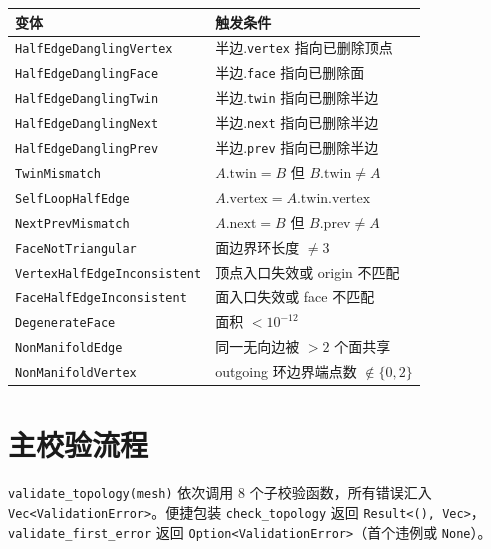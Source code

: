 \documentclass[11pt,a4paper]{article}
\begin{document}
\begin{center}
\renewcommand{\arraystretch}{1.18}
\begin{tabular}{@{}ll@{}}
  \toprule
  \textbf{变体} & \textbf{触发条件} \\
  \midrule
  \texttt{HalfEdgeDanglingVertex} & 半边.\texttt{vertex} 指向已删除顶点 \\
  \texttt{HalfEdgeDanglingFace}   & 半边.\texttt{face} 指向已删除面 \\
  \texttt{HalfEdgeDanglingTwin}   & 半边.\texttt{twin} 指向已删除半边 \\
  \texttt{HalfEdgeDanglingNext}   & 半边.\texttt{next} 指向已删除半边 \\
  \texttt{HalfEdgeDanglingPrev}   & 半边.\texttt{prev} 指向已删除半边 \\
  \texttt{TwinMismatch}           & $A.\mathrm{twin}=B$ 但 $B.\mathrm{twin}\ne A$ \\
  \texttt{SelfLoopHalfEdge}       & $A.\mathrm{vertex} = A.\mathrm{twin}.\mathrm{vertex}$ \\
  \texttt{NextPrevMismatch}       & $A.\mathrm{next}=B$ 但 $B.\mathrm{prev}\ne A$ \\
  \texttt{FaceNotTriangular}      & 面边界环长度 $\ne 3$ \\
  \texttt{VertexHalfEdgeInconsistent} & 顶点入口失效或 origin 不匹配 \\
  \texttt{FaceHalfEdgeInconsistent}   & 面入口失效或 face 不匹配 \\
  \texttt{DegenerateFace}         & 面积 $< 10^{-12}$ \\
  \texttt{NonManifoldEdge}        & 同一无向边被 $> 2$ 个面共享 \\
  \texttt{NonManifoldVertex}      & outgoing 环边界端点数 $\notin \{0, 2\}$ \\
  \bottomrule
\end{tabular}
\end{center}

\section{主校验流程}

\texttt{validate\_topology(mesh)} 依次调用 8 个子校验函数，所有错误汇入
\texttt{Vec<ValidationError>}。便捷包装 \texttt{check\_topology} 返回
\texttt{Result<(), Vec>}，\texttt{validate\_first\_error} 返回
\texttt{Option<ValidationError>}（首个违例或 \texttt{None}）。
\end{document}
